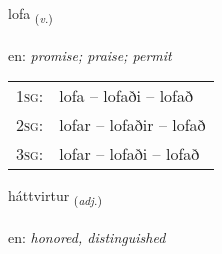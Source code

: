 \documentclass[frontgrid, backgrid]{flacards}\usepackage[]{graphicx}\usepackage[]{color}
\begin{document}
\renewcommand{\flhead}{\vskip5pt \fboxsep=0pt {\small\bfseries\footnotesize Sagnorð | Verb}}
\renewcommand{\fcfoot}{\vskip5pt \fboxsep=0pt \hspace{2pt}{\small\bfseries\footnotesize 2K}}

\renewcommand{\blhead}{\vskip5pt {\small\bfseries\footnotesize Sagnorð | Verb }}
\renewcommand{\bcfoot}{\vskip5pt \hspace{2pt}{\small\bfseries\footnotesize 2K}}


{lofa \small{\textsubscript{(\textit{v.})}} \\[1ex] %
\textphonetic{[lɔːva]} \\
en: \emph{promise; praise; permit} \\  [2ex]
\renewcommand*{\arraystretch}{0.8}
\begin{tabular}{p{1cm}l}
\textsc{1sg}: & lofa -- lofaði -- lofað \\ 
\textsc{2sg}: & lofar -- lofaðir -- lofað \\ 
\textsc{3sg}: & lofar -- lofaði -- lofað \\ 
\end{tabular}
}

\renewcommand{\flhead}{\vskip5pt \fboxsep=0pt {\small\bfseries\footnotesize Lýsingarorð | Adjective}}
\renewcommand{\fcfoot}{\vskip5pt \fboxsep=0pt \hspace{2pt}{\small\bfseries\footnotesize 2K}}

\renewcommand{\blhead}{\vskip5pt {\small\bfseries\footnotesize Lýsingarorð | Adjective }}
\renewcommand{\bcfoot}{\vskip5pt \hspace{2pt}{\small\bfseries\footnotesize 2K}}


{háttvirtur \small{\textsubscript{(\textit{adj.})}} \\[1ex] %
 \\
en: \emph{honored, distinguished} \\  [2ex]
\renewcommand*{\arraystretch}{0.8}
}
\end{document}
